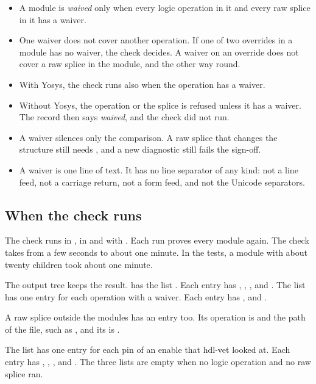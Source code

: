 \begin{itemize}
\item A module is \emph{waived} only when every logic operation in it and every raw splice
  in it has a waiver.
\item One waiver does not cover another operation. If one of two overrides in a module has
  no waiver, the check decides. A waiver on an override does not cover a raw splice in the
  module, and the other way round.
\item With Yosys, the check runs also when the operation has a waiver.
\item Without Yosys, the operation or the splice is refused unless it has a waiver. The
  record then says \emph{waived}, and the check did not run.
\item A waiver silences only the comparison. A raw splice that changes the structure still
  needs , and a new diagnostic still fails the sign-off.
\item A waiver is one line of text. It has no line separator of any kind: not a line
  feed, not a carriage return, not a form feed, and not the Unicode separators.
\end{itemize}

\subsection*{When the check runs}

The check runs in , in  and with .
Each run proves every module again. The check takes from a few seconds to about one minute.
In the tests, a module with about twenty children took about one minute.

The output tree keeps the result.  has the list . Each
entry has , , ,  and
. The list  has one entry for each operation with a waiver. Each
entry has ,  and .

A raw splice outside the modules
has an entry too. Its operation is  and the path of the file, such as
, and its  is .

The list  has one
entry for each pin of an enable that hdl-vet looked at. Each entry has ,
, ,  and . The three lists are empty
when no logic operation and no raw splice ran.

